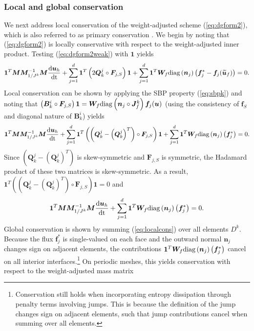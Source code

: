 \documentclass[10pt]{amsart}
\theoremstyle{definition}
\theoremstyle{lemma}
\theoremstyle{theorem}
\theoremstyle{assumption}
\renewcommand{\tilde}{\widetilde}
\newcommand{\td}[2]{\frac{{\rm d}#1}{{\rm d}{\rm #2}}}
\newcommand{\LRp}[1]{\left( #1 \right)}
\newcommand{\note}[1]{{\color{blue}{#1}}}
\newcommand{\lcwnote}[1]{{\color{magenta}{#1}}}
\newcommand{\diag}[1]{{\rm diag}\LRp{#1}}
\begin{document}
{\subsubsection{Local and global conservation}
\label{sec:conservation}
We next address local conservation of the weight-adjusted scheme (\ref{eq:dgform2}), which is also referred to as primary conservation \cite{fisher2013discretely, fisher2013high, carpenter2014entropy, friedrich2017entropy}.  We begin by noting that (\ref{eq:dgform2}) is locally conservative with respect to the weight-adjusted inner product.  Testing (\ref{eq:dgform2weak}) with $\bm{1}$ yields
\[
\bm{1}^T\bm{M}\bm{M}_{1/J^k}^{-1}\bm{M}\td{\bm{u}_h}{t} + 
\sum_{j=1}^d \bm{1}^T \LRp{2\bm{Q}^j_k \circ \bm{F}_{j,S}}\bm{1} + \sum_{j=1}^d \bm{1}^T\bm{W}_f \diag{\bm{n}_j}\LRp{\bm{f}_j^* - \bm{f}_j(\tilde{\bm{u}}_f)} = 0.
\]
Local conservation can be shown by applying the SBP property (\ref{eq:sbpk}) and noting that $\LRp{\bm{B}^i_k \circ \bm{F}_{j,S}}\bm{1} = \bm{W}_f\diag{\bm{n}_j \circ \bm{J}^k_f}\bm{f}_j(\bm{u})$ (using the consistency of $\bm{f}_S$ and diagonal nature of $\bm{B}^i_k$) yields
\[
\bm{1}^T\bm{M}\bm{M}_{1/J^k}^{-1}\bm{M}\td{\bm{u}_h}{t} + 
\sum_{j=1}^d \bm{1}^T \LRp{\LRp{\bm{Q}^j_k-\LRp{\bm{Q}^j_k}^T} \circ \bm{F}_{j,S}}\bm{1} + \sum_{j=1}^d \bm{1}^T\bm{W}_f \diag{\bm{n}_j}\LRp{\bm{f}_j^*} = 0.
\]
Since $\LRp{\bm{Q}^j_k-\LRp{\bm{Q}^j_k}^T} $ is skew-symmetric and $\bm{F}_{j,S}$ is symmetric, the Hadamard product of these two matrices is skew-symmetric.  As a result, $\bm{1}^T \LRp{\LRp{\bm{Q}^j_k-\LRp{\bm{Q}^j_k}^T} \circ \bm{F}_{j,S}}\bm{1} = 0$ and 
\begin{equation}
\bm{1}^T\bm{M}\bm{M}_{1/J^k}^{-1}\bm{M}\td{\bm{u}_h}{t} + \sum_{j=1}^d \bm{1}^T\bm{W}_f \diag{\bm{n}_j}\LRp{\bm{f}_j^*} = 0.
\label{eq:localcons}
\end{equation}
Global conservation is shown by summing (\ref{eq:localcons}) over all elements $D^k$.  Because the flux $\bm{f}_j^*$ is single-valued on each face and the outward normal $\bm{n}_j$ changes sign on adjacent elements, the contributions $\bm{1}^T\bm{W}_f \diag{\bm{n}_j}\LRp{\bm{f}_j^*}$ cancel on all interior interfaces.\footnote{Conservation still holds when incorporating entropy dissipation through penalty terms involving jumps.  This is because the definition of the jump changes sign on adjacent elements, such that jump contributions cancel when summing over all elements.} On periodic meshes, this yields conservation with respect to the weight-adjusted mass matrix
}
\end{document}
